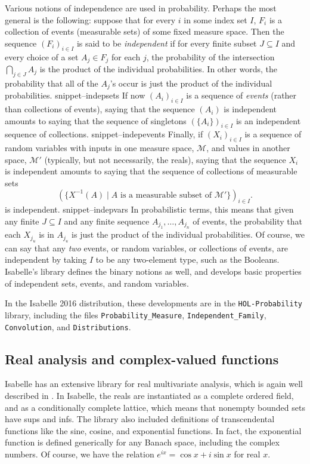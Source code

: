 \documentclass{svjour3}
\newcommand{\mdl}[1]{{\mathcal #1}} %
\newcommand{\Snippet}[1]{\csname snippet--#1\endcsname}
\begin{document}
Various notions of independence are used in probability. Perhaps the most general is the following: suppose that for every $i$ in some index set $I$, $F_i$ is a collection of events (measurable sets) of some fixed measure space. Then the sequence $(F_i)_{i \in I}$ is said to be \emph{independent} if for every finite subset $J \subseteq I$ and every choice of a set $A_j \in F_j$ for each $j$, the probability of the intersection $\bigcap_{j \in J} A_j$ is the product of the individual probabilities. In other words, the probability that all of the $A_j$'s occur is just the product of the individual probabilities.
\Snippet{indepsets}
If now $(A_i)_{i \in I}$ is a sequence of \emph{events} (rather than collections of events), saying that the sequence $(A_i)$ is independent amounts to saying that the sequence of singletons $(\{A_i\})_{i \in I}$ is an independent sequence of collections.
\Snippet{indepevents}
Finally, if $(X_i)_{i \in I}$ is a sequence of random variables with inputs in one measure space, $\mdl M$, and values in another space, $\mdl M'$ (typically, but not necessarily, the reals), saying that the sequence $X_i$ is independent amounts to saying that the sequence of collections of measurable sets 
\[
(\{ X^{-1}(A) \; | \; \mbox{$A$ is a measurable subset of $\mdl M'$}\})_{i \in I}.
\]
is independent.
\Snippet{indepvars}
In probabilistic terms, this means that given any finite $J \subseteq I$ and any finite sequence $A_{j_1}, \ldots, A_{j_n}$ of events, the probability that each $X_{j_u}$ is in $A_{j_u}$ is just the product of the individual probabilities. Of course, we can say that any \emph{two} events, or random variables, or collections of events, are independent by taking $I$ to be any two-element type, such as the Booleans. Isabelle's library defines the binary notions as well, and develops basic properties of independent sets, events, and random variables.

In the Isabelle 2016 distribution, these developments are in the \texttt{HOL-Probability} library, including the files \verb=Probability_Measure=, \verb=Independent_Family=, \texttt{Convolution}, and \texttt{Distributions}.

\subsection{Real analysis and complex-valued functions}
\label{subsection:real:analysis}

Isabelle has an extensive library for real multivariate analysis, which is again well described in \cite{hoelzl:et:al:13}. In Isabelle, the reals are instantiated as a complete ordered field, and as a conditionally complete lattice, which means that nonempty bounded sets have sups and infs. The library also included definitions of transcendental functions like the sine, cosine, and exponential functions. In fact, the exponential function is defined generically for any Banach space, including the complex numbers. Of course, we have the relation $e^{i x} = \cos x + i \sin x$ for real $x$.
\end{document}
